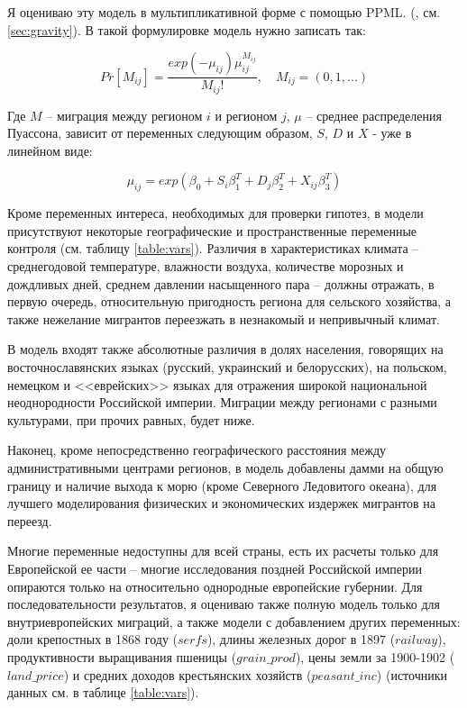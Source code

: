 \documentclass[a4paper,12pt]{article}
\begin{document}
Я оцениваю эту модель в мультипликативной форме с помощью PPML. (\cite{silva_log_2006}, см. \ref{sec:gravity}). В такой формулировке модель нужно записать так:

\begin{equation}\label{eq:poisson}
	Pr[M_{ij}] = \frac{exp(-\mu_{ij})\mu^{M_{ij}}_{ij}}{M_{ij}!},\quad M_{ij} = (0, 1, ...)
\end{equation}

Где $M$ – миграция между регионом $i$ и регионом $j$, $\mu$ – среднее распределения Пуассона, зависит от переменных следующим образом, $S$, $D$ и $X$ - уже в линейном виде:

\begin{equation}\label{eq:mu}
	\mu_{ij} = exp(\beta_0 + S_i \beta_1^T + D_{j} \beta_2^T + X_{ij} \beta_3^T)
\end{equation}

Кроме переменных интереса, необходимых для проверки гипотез, в модели присутствуют некоторые географические и пространственные переменные контроля (см. таблицу \ref{table:vars}). Различия в характеристиках климата – среднегодовой температуре, влажности воздуха, количестве морозных и дождливых дней, среднем давлении насыщенного пара – должны отражать, в первую очередь, относительную пригодность региона для сельского хозяйства, а также нежелание мигрантов переезжать в незнакомый и непривычный климат. 

В модель входят также абсолютные различия в долях населения, говорящих на восточнославянских языках (русский, украинский и белорусских), на польском, немецком и <<еврейских>> языках для отражения широкой национальной неоднородности Российской империи. Миграции между регионами с разными культурами, при прочих равных, будет ниже. 

Наконец, кроме непосредственно географического расстояния между административными центрами регионов, в модель добавлены дамми на общую границу и наличие выхода к морю (кроме Северного Ледовитого океана), для лучшего моделирования физических и экономических издержек мигрантов на переезд. 

Многие переменные недоступны для всей страны, есть их расчеты только для Европейской ее части -- многие исследования поздней Российской империи опираются только на относительно однородные европейские губернии. Для последовательности результатов, я оцениваю также полную модель только для внутриевропейских миграций, а также модели с добавлением других переменных: доли крепостных в 1868 году ($serfs$), длины железных дорог в 1897 ($railway$), продуктивности выращивания пшеницы (${grain\_prod}$), цены земли за 1900-1902 (${land\_price}$) и средних доходов крестьянских хозяйств (${peasant\_inc}$) (источники данных см. в таблице \ref{table:vars}).
\end{document}
